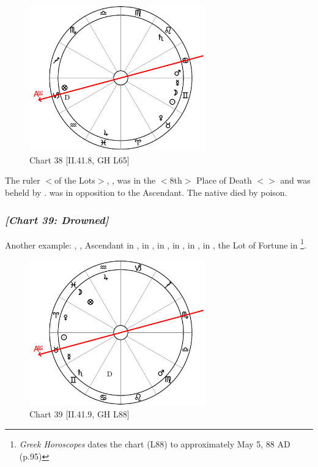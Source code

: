 \clearpage
\begin{figure}
\centering
\vspace{-20pt}
\includegraphics[width=0.68\textwidth]{charts/2_41_8}
\caption{Chart 38 [II.41.8, GH L65]}
\label{fig:chart38}
\end{figure} 
 
The ruler $<$of the Lots$>$, \Saturn, was in the $<$8th$>$ Place of Death $<$\Leo$>$ and was beheld by \Venus. \Mars\xspace was in opposition to the Ascendant. The native died by poison.
\newpage
\subsubsection{\textit{[Chart 39: Drowned]}}
Another example: \Sun, \Mercury, Ascendant in \Taurus, \Moon\xspace in \Pisces, \Saturn\xspace in \Gemini, \Jupiter\xspace in \Aquarius, \Mars\xspace in \Virgo, \Venus\xspace in \Aries, the Lot of Fortune in \Pisces
\footnote{\textit{Greek Horoscopes} dates the chart (L88) to approximately May 5, 88 AD (p.95)}.   

\clearpage
\begin{figure}
\centering
\vspace{-20pt}
\includegraphics[width=0.68\textwidth]{charts/2_41_9}
\caption{Chart 39 [II.41.9, GH L88]}
\label{fig:chart39}
\end{figure} 

